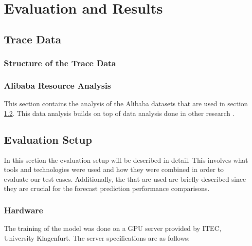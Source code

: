 \chapter{Evaluation and Results}
\label{ch:evaluation-and-results}

\section{Trace Data}
\label{sec:data-analysis-evaluation}

  \subsection{Structure of the Trace Data}

  \subsection{Alibaba Resource Analysis}
  \label{sec:alibaba-resource-analysis-data-analysis}

    This section contains the analysis of the Alibaba datasets that are used in section \ref{sec:evaluation-setup}. This data analysis builds on top of data analysis done in other research \cite{fengcunDeepJSJobScheduling2023}.

\section{Evaluation Setup}
\label{sec:evaluation-setup}

  In this section the evaluation setup will be described in detail. 
  This involves what tools and technologies were used and how they were combined in order to evaluate our test cases. Additionally, the  that are used are briefly described since they are crucial for the forecast prediction performance comparisons.
  
  \subsection{Hardware}
  \label{sec:hardware}

    The training of the  model was done on a GPU server provided by ITEC, University Klagenfurt. The server specifications are as follows:

